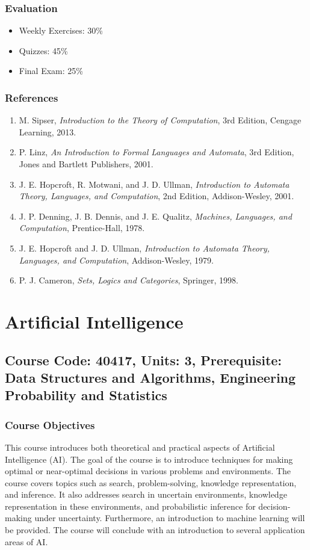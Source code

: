\documentclass[12pt]{article}
\begin{document}
\subsubsection*{Evaluation}
\begin{itemize}
    \item Weekly Exercises: 30\%
    \item Quizzes: 45\%
    \item Final Exam: 25\%
\end{itemize}

\subsubsection*{References}
\begin{enumerate}
    \item M. Sipser, \textit{Introduction to the Theory of Computation}, 3rd Edition, Cengage Learning, 2013.
    \item P. Linz, \textit{An Introduction to Formal Languages and Automata}, 3rd Edition, Jones and Bartlett Publishers, 2001.
    \item J. E. Hopcroft, R. Motwani, and J. D. Ullman, \textit{Introduction to Automata Theory, Languages, and Computation}, 2nd Edition, Addison-Wesley, 2001.
    \item J. P. Denning, J. B. Dennis, and J. E. Qualitz, \textit{Machines, Languages, and Computation}, Prentice-Hall, 1978.
    \item J. E. Hopcroft and J. D. Ullman, \textit{Introduction to Automata Theory, Languages, and Computation}, Addison-Wesley, 1979.
    \item P. J. Cameron, \textit{Sets, Logics and Categories}, Springer, 1998.
\end{enumerate}

\newpage

\section{Artificial Intelligence}
\subsection*{Course Code: 40417, Units: 3, Prerequisite: Data Structures and Algorithms, Engineering Probability and Statistics}

\subsubsection*{Course Objectives}
This course introduces both theoretical and practical aspects of Artificial Intelligence (AI). The goal of the course is to introduce techniques for making optimal or near-optimal decisions in various problems and environments. The course covers topics such as search, problem-solving, knowledge representation, and inference. It also addresses search in uncertain environments, knowledge representation in these environments, and probabilistic inference for decision-making under uncertainty. Furthermore, an introduction to machine learning will be provided. The course will conclude with an introduction to several application areas of AI.
\end{document}

